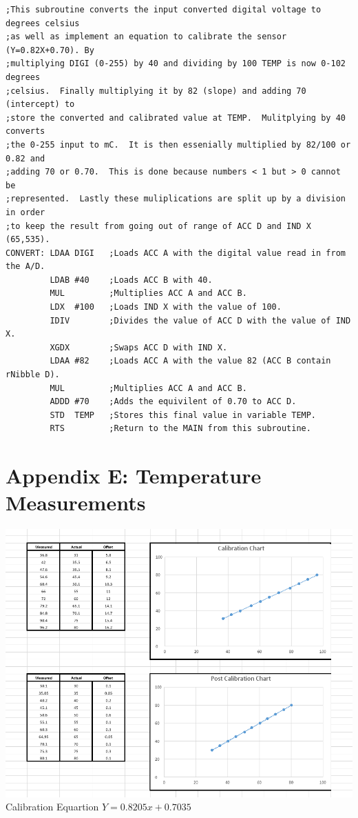 \documentclass[12pt]{report}
\begin{document}
\begin{Verbatim}[frame=single, fontsize=\small]
;This subroutine converts the input converted digital voltage to degrees celsius
;as well as implement an equation to calibrate the sensor (Y=0.82X+0.70). By
;multiplying DIGI (0-255) by 40 and dividing by 100 TEMP is now 0-102 degrees
;celsius.  Finally multiplying it by 82 (slope) and adding 70 (intercept) to
;store the converted and calibrated value at TEMP.  Mulitplying by 40 converts
;the 0-255 input to mC.  It is then essenially multiplied by 82/100 or 0.82 and
;adding 70 or 0.70.  This is done because numbers < 1 but > 0 cannot be
;represented.  Lastly these muliplications are split up by a division in order
;to keep the result from going out of range of ACC D and IND X (65,535).
CONVERT: LDAA DIGI   ;Loads ACC A with the digital value read in from the A/D.
         LDAB #40    ;Loads ACC B with 40.
         MUL         ;Multiplies ACC A and ACC B.
         LDX  #100   ;Loads IND X with the value of 100.
         IDIV        ;Divides the value of ACC D with the value of IND X.
         XGDX        ;Swaps ACC D with IND X.
         LDAA #82    ;Loads ACC A with the value 82 (ACC B contain rNibble D).
         MUL         ;Multiplies ACC A and ACC B.
         ADDD #70    ;Adds the equivilent of 0.70 to ACC D.
         STD  TEMP   ;Stores this final value in variable TEMP.
         RTS         ;Return to the MAIN from this subroutine.
	\end{Verbatim}
	
\section*{Appendix E: Temperature Measurements}
	\begin{center}
		\includegraphics[scale=.60]{c.PNG}
		Calibration Equartion $Y = 0.8205x + 0.7035$
	\end{center}
\end{document}
